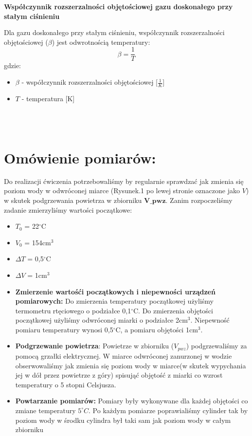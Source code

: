 \documentclass{article}
\begin{document}
\textbf{Współczynnik rozszerzalności objętościowej gazu doskonałego przy stałym ciśnieniu} 

Dla gazu doskonałego przy stałym ciśnieniu, współczynnik rozszerzalności objętościowej ($\beta$) jest odwrotnością temperatury:
\begin{equation}
    \beta = \frac{1}{T}
\end{equation}
gdzie:
\begin{itemize}
    \item $\beta$ - współczynnik rozszerzalności objętościowej [$\frac{1}{K}$]
    \item $T$ - temperatura [K]
\end{itemize}


\\
\hline
\\
\section{Omówienie pomiarów:}
Do realizacji ćwiczenia  potrzebowaliśmy by regularnie sprawdzać jak zmienia się poziom wody w odwróconej miarce (Rysunek.1 po lewej stronie oznaczone jako $V$) w skutek podgrzewania powietrza w zbiorniku $\textbf{V_{pwz}}$. Zanim rozpoczeliśmy zadanie zmierzyliśmy wartości początkowe:
\begin{itemize}
    \item $T_0$ = 22$^{\circ}$C
    \item $V_0$ = 154cm$^3$
    \item $\Delta T$ = 0,5$^{\circ}$C
    \item $\Delta V$ = 1cm$^3$
\end{itemize}

\begin{itemize}
    \item \textbf{Zmierzenie wartośći początkowych i niepewności urządzeń pomiarowych:} Do zmierzenia temperatury początkowej użyliśmy termometru rtęciowego o podziałce 0,1$^{\circ}$C. Do zmierzenia objętości początkowej użyliśmy odwróconej miarki o podziałce 2cm$^3$. Niepewność pomiaru temperatury wynosi 0,5$^{\circ}$C, a pomiaru objętości 1cm$^3$.
    \item \textbf{Podgrzewanie powietrza}: Powietrze w zbiorniku ($V_{pwz}$) podgrzewaliśmy za pomocą grzałki elektrycznej. W miarce odwróconej zanurzonej w wodzie obserwowaliśmy jak zmienia się poziom wody w miarce(w skutek wypychania jej w dół przez powietrze z góry) spisująć objętość z miarki co wzrost temperatury o 5 stopni Celsjusza.
    \item \textbf{Powtarzanie pomiarów:} Pomiary były wykonywane dla każdej objętości co zmiane temperatury $5^{\circ} C$. Po każdym pomiarze poprawialiśmy cylinder tak by poziom wody w środku cylindra był taki sam jak poziom wody w całym zbiorniku
\end{itemize}
\end{document}

